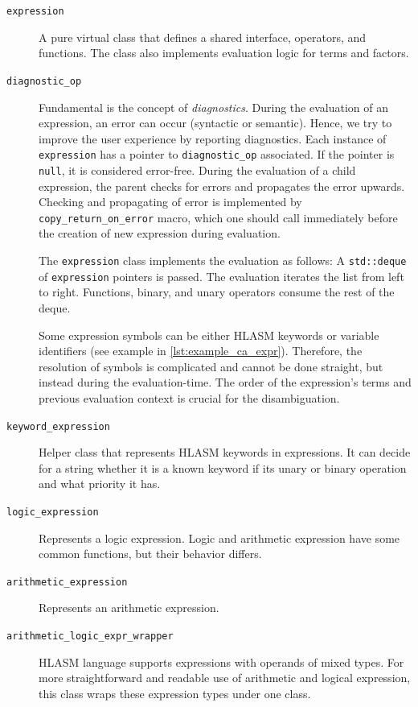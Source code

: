\begin{description}
	\item[\texttt{expression}] A pure virtual class that defines a shared interface, operators, and functions. The class also implements evaluation logic for terms and factors. 
	
	\item[\texttt{diagnostic\_op}] Fundamental is the concept of \emph{diagnostics}. During the evaluation of an expression, an error can occur (syntactic or semantic). Hence, we try to improve the user experience by reporting diagnostics. Each instance of \texttt{expression} has a pointer to \texttt{diagnostic\_op} associated. If the pointer is \texttt{null}, it is considered error-free. During the evaluation of a child expression, the parent checks for errors and propagates the error upwards. Checking and propagating of error is implemented by \texttt{copy\_return\_on\_error} macro, which one should call immediately before the creation of new expression during evaluation.
	
	The \texttt{expression} class implements the evaluation as follows:
	A \texttt{std::deque} of \texttt{expression} pointers is passed. The evaluation iterates the list from left to right.  Functions, binary, and unary operators consume the rest of the deque.
	
	Some expression symbols can be either HLASM keywords or variable identifiers (see example in \cref{lst:example_ca_expr}). Therefore, the resolution of symbols is complicated and cannot be done straight, but instead during the evaluation-time. The order of the expression's terms and previous evaluation context is crucial for the disambiguation. 
	
	\item[\texttt{keyword\_expression}] Helper class that represents HLASM keywords in expressions. It can decide for a string whether it is a known keyword if its unary or binary operation and what priority it has.
	
	\item[\texttt{logic\_expression}] Represents a logic expression. Logic and arithmetic expression have some common functions, but their behavior differs. 
	
	\item[\texttt{arithmetic\_expression}] Represents an arithmetic expression.
	
	\item[\texttt{arithmetic\_logic\_expr\_wrapper}] HLASM language supports expressions with operands of mixed types. For more straightforward and readable use of arithmetic and logical expression, this class wraps these expression types under one class.
	

\end{description}
